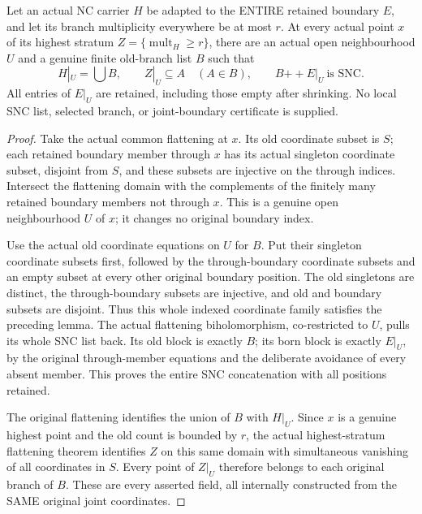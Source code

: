 \begin{theorem}
\label{hir:nc-original-highest-joint-branch-chart}
\leanok
Let an actual NC carrier $H$ be adapted to the ENTIRE retained boundary $E$,
and let its branch multiplicity everywhere be at most $r$. At every actual
point $x$ of its highest stratum $Z=\{\operatorname{mult}_H\ge r\}$, there are
an actual open neighbourhood $U$ and a genuine finite old-branch list $B$ such
that
\[
 H|_U=\bigcup B,\qquad Z|_U\subseteq A\quad(A\in B),\qquad
 B\mathbin{+\!+}E|_U\ \text{is SNC}.
\]
All entries of $E|_U$ are retained, including those empty after shrinking.
No local SNC list, selected branch, or joint-boundary certificate is supplied.
\end{theorem}
\begin{proof}
Take the actual common flattening at $x$. Its old coordinate subset is $S$;
each retained boundary member through $x$ has its actual singleton coordinate
subset, disjoint from $S$, and these subsets are injective on the through
indices. Intersect the flattening domain with the complements of the finitely
many retained boundary members not through $x$. This is a genuine open
neighbourhood $U$ of $x$; it changes no original boundary index.

Use the actual old coordinate equations on $U$ for $B$. Put their singleton
coordinate subsets first, followed by the through-boundary coordinate subsets
and an empty subset at every other original boundary position. The old
singletons are distinct, the through-boundary subsets are injective, and
old and boundary subsets are disjoint. Thus this whole indexed coordinate
family satisfies the preceding lemma. The actual flattening biholomorphism,
co-restricted to $U$, pulls its whole SNC list back. Its old block is exactly
$B$; its born block is exactly $E|_U$, by the original through-member equations
and the deliberate avoidance of every absent member. This proves the entire
SNC concatenation with all positions retained.

The original flattening identifies the union of $B$ with $H|_U$. Since $x$
is a genuine highest point and the old count is bounded by $r$, the actual
highest-stratum flattening theorem identifies $Z$ on this same domain with
simultaneous vanishing of all coordinates in $S$. Every point of $Z|_U$
therefore belongs to each original branch of $B$. These are every asserted
field, all internally constructed from the SAME original joint coordinates.
\end{proof}
